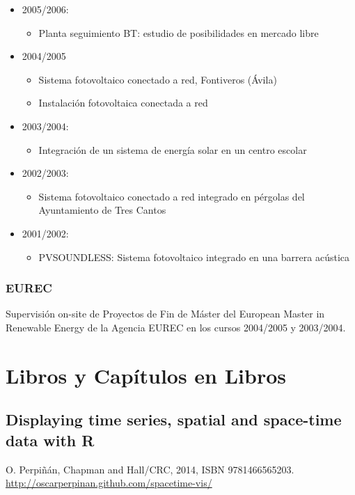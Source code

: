 \documentclass[article, a4paper]{memoir}
\begin{document}
\begin{itemize}
\begin{itemize}
\end{itemize}
\item 2005/2006:
\begin{itemize}
\item \guillemotleft{}Planta seguimiento BT: estudio de posibilidades en mercado libre\guillemotright{}
\end{itemize}
\item 2004/2005
\begin{itemize}
\item \guillemotleft{}Sistema fotovoltaico conectado a red, Fontiveros (Ávila)\guillemotright{}
\item \guillemotleft{}Instalación fotovoltaica conectada a red\guillemotright{}
\end{itemize}
\item 2003/2004:
\begin{itemize}
\item \guillemotleft{}Integración de un sistema de energía solar en un centro escolar\guillemotright{}
\end{itemize}
\item 2002/2003:
\begin{itemize}
\item \guillemotleft{}Sistema fotovoltaico conectado a red integrado en pérgolas del Ayuntamiento de Tres Cantos\guillemotright{}
\end{itemize}
\item 2001/2002:
\begin{itemize}
\item \guillemotleft{}PVSOUNDLESS: Sistema fotovoltaico integrado en una barrera acústica\guillemotright{}
\end{itemize}
\end{itemize}

\subsubsection{EUREC}
\label{sec:orgheadline18}
Supervisión on-site de Proyectos de Fin de Máster del European Master in Renewable Energy de la Agencia EUREC en los cursos 2004/2005 y 2003/2004.

\section{Libros y Capítulos en Libros}
\label{sec:orgheadline27}

\subsection{Displaying time series, spatial and space-time data with R}
\label{sec:orgheadline21}
O. Perpiñán, Chapman and Hall/CRC, 2014, ISBN 9781466565203. \url{http://oscarperpinan.github.com/spacetime-vis/}
\end{document}
